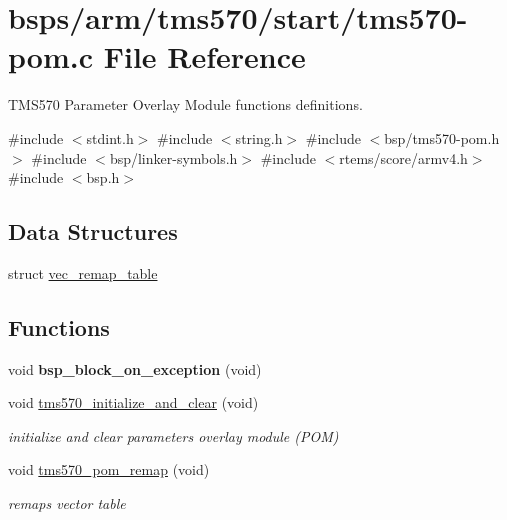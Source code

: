 \hypertarget{tms570-pom_8c}{}\section{bsps/arm/tms570/start/tms570-\/pom.c File Reference}
\label{tms570-pom_8c}


T\+M\+S570 Parameter Overlay Module functions definitions.  


{\ttfamily \#include $<$stdint.\+h$>$}\newline
{\ttfamily \#include $<$string.\+h$>$}\newline
{\ttfamily \#include $<$bsp/tms570-\/pom.\+h$>$}\newline
{\ttfamily \#include $<$bsp/linker-\/symbols.\+h$>$}\newline
{\ttfamily \#include $<$rtems/score/armv4.\+h$>$}\newline
{\ttfamily \#include $<$bsp.\+h$>$}\newline
\subsection*{Data Structures}
\begin{DoxyCompactItemize}
\item 
struct \mbox{\hyperlink{structvec__remap__table}{vec\+\_\+remap\+\_\+table}}
\end{DoxyCompactItemize}
\subsection*{Functions}
\begin{DoxyCompactItemize}
\item 
\mbox{\label{tms570-pom_8c_a09ba2c7b8831e73857517fd47c872eed}} 
void {\bfseries bsp\+\_\+block\+\_\+on\+\_\+exception} (void)
\item 
void \mbox{\hyperlink{tms570-pom_8c_a910d08b5bfffed83b88de9eb2ab27bc5}{tms570\+\_\+initialize\+\_\+and\+\_\+clear}} (void)
\begin{DoxyCompactList}\small\item\em initialize and clear parameters overlay module (P\+OM) \end{DoxyCompactList}\item 
void \mbox{\hyperlink{tms570-pom_8c_aa5484712012d1e84f9422450a76fd6d4}{tms570\+\_\+pom\+\_\+remap}} (void)
\begin{DoxyCompactList}\small\item\em remaps vector table \end{DoxyCompactList}\end{DoxyCompactItemize}
